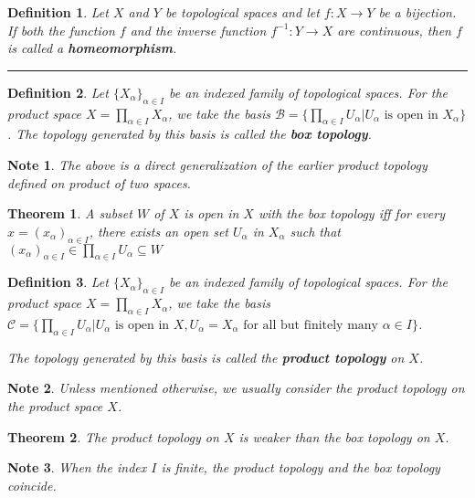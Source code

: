 \documentclass[14pt,twoside]{extreport}
\newcommand{\hhrule}{\vspace{1cm}\hrule\vspace{1cm}}
\theoremstyle{dotless}
\newtheorem*{defn}{Definition}
\newtheorem*{thm}{Theorem} %
\newtheorem*{note}{Note} %
\begin{document}
\begin{defn}
    Let $X$ and $Y$ be topological spaces and let $f: X \to Y$ be a bijection. If both the function $f$ and the inverse function $f^{-1}: Y \to X$ are continuous, then $f$ is called a \textbf{homeomorphism}.
\end{defn}

\hhrule


\begin{defn}
    Let $\{ X_\alpha \}_{\alpha \in I}$ be an indexed family of topological spaces. For the product space $X =  \prod_{\alpha \in I} X_\alpha$, we take the basis $\mathscr{B} = \{ \prod_{\alpha \in I} U_\alpha | U_\alpha \text{ is open in } X_\alpha \}$. The topology generated by this basis is called the \textbf{box topology}. 
\end{defn}

\begin{note}
    The above is a direct generalization of the earlier product topology defined on product of two spaces.
\end{note}

\begin{thm}
    A subset $W$ of $X$ is open in $X$ with the box topology iff for every $x = (x_\alpha)_{\alpha \in I}$, there exists an open set $U_\alpha$ in $X_\alpha$ such that $(x_\alpha)_{\alpha \in I} \in \prod_{\alpha \in I} U_\alpha \subseteq W$
\end{thm}

\begin{defn}
Let $\{ X_\alpha \}_{\alpha \in I}$ be an indexed family of topological spaces. For the product space $X =  \prod_{\alpha \in I} X_\alpha$, we take the basis $\mathscr{C} = \{ \prod_{\alpha \in I} U_\alpha | U_\alpha \text{ is open in } X, U_\alpha = X_\alpha \text{ for all but finitely many } \alpha \in I \}$. 

    The topology generated by this basis is called the \textbf{product topology} on $X$.
\end{defn}

\begin{note}
    Unless mentioned otherwise, we usually consider the product topology on the product space $X$.
\end{note}

\begin{thm}
    The product topology on $X$ is weaker than the box topology on $X$.
\end{thm}

\begin{note}
    When the index $I$ is finite, the product topology and the box topology coincide.
\end{note}
\end{document}
